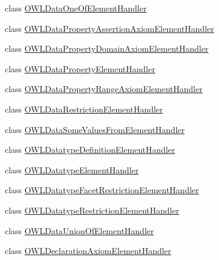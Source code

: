 \begin{DoxyCompactItemize}
\item 
class \hyperlink{classorg_1_1coode_1_1owlapi_1_1owlxmlparser_1_1_o_w_l_data_one_of_element_handler}{O\-W\-L\-Data\-One\-Of\-Element\-Handler}
\item 
class \hyperlink{classorg_1_1coode_1_1owlapi_1_1owlxmlparser_1_1_o_w_l_data_property_assertion_axiom_element_handler}{O\-W\-L\-Data\-Property\-Assertion\-Axiom\-Element\-Handler}
\item 
class \hyperlink{classorg_1_1coode_1_1owlapi_1_1owlxmlparser_1_1_o_w_l_data_property_domain_axiom_element_handler}{O\-W\-L\-Data\-Property\-Domain\-Axiom\-Element\-Handler}
\item 
class \hyperlink{classorg_1_1coode_1_1owlapi_1_1owlxmlparser_1_1_o_w_l_data_property_element_handler}{O\-W\-L\-Data\-Property\-Element\-Handler}
\item 
class \hyperlink{classorg_1_1coode_1_1owlapi_1_1owlxmlparser_1_1_o_w_l_data_property_range_axiom_element_handler}{O\-W\-L\-Data\-Property\-Range\-Axiom\-Element\-Handler}
\item 
class \hyperlink{classorg_1_1coode_1_1owlapi_1_1owlxmlparser_1_1_o_w_l_data_restriction_element_handler}{O\-W\-L\-Data\-Restriction\-Element\-Handler}
\item 
class \hyperlink{classorg_1_1coode_1_1owlapi_1_1owlxmlparser_1_1_o_w_l_data_some_values_from_element_handler}{O\-W\-L\-Data\-Some\-Values\-From\-Element\-Handler}
\item 
class \hyperlink{classorg_1_1coode_1_1owlapi_1_1owlxmlparser_1_1_o_w_l_datatype_definition_element_handler}{O\-W\-L\-Datatype\-Definition\-Element\-Handler}
\item 
class \hyperlink{classorg_1_1coode_1_1owlapi_1_1owlxmlparser_1_1_o_w_l_datatype_element_handler}{O\-W\-L\-Datatype\-Element\-Handler}
\item 
class \hyperlink{classorg_1_1coode_1_1owlapi_1_1owlxmlparser_1_1_o_w_l_datatype_facet_restriction_element_handler}{O\-W\-L\-Datatype\-Facet\-Restriction\-Element\-Handler}
\item 
class \hyperlink{classorg_1_1coode_1_1owlapi_1_1owlxmlparser_1_1_o_w_l_datatype_restriction_element_handler}{O\-W\-L\-Datatype\-Restriction\-Element\-Handler}
\item 
class \hyperlink{classorg_1_1coode_1_1owlapi_1_1owlxmlparser_1_1_o_w_l_data_union_of_element_handler}{O\-W\-L\-Data\-Union\-Of\-Element\-Handler}
\item 
class \hyperlink{classorg_1_1coode_1_1owlapi_1_1owlxmlparser_1_1_o_w_l_declaration_axiom_element_handler}{O\-W\-L\-Declaration\-Axiom\-Element\-Handler}

\end{DoxyCompactItemize}
